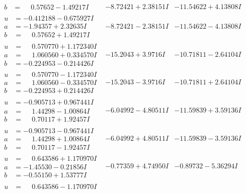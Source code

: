 \documentclass[1p]{elsarticle_modified}
\theoremstyle{definition}
\begin{document}
$$\begin{array}{c|c|c}
\begin{aligned}
b &= \phantom{-}0.57652 - 1.49217 I\end{aligned}
 & -8.72421 + 2.38151 I & -11.54622 + 4.13808 I \\ \hline\begin{aligned}
u &= -0.412188 - 0.675927 I \\
a &= -1.94357 + 2.32635 I \\
b &= \phantom{-}0.57652 + 1.49217 I\end{aligned}
 & -8.72421 - 2.38151 I & -11.54622 - 4.13808 I \\ \hline\begin{aligned}
u &= \phantom{-}0.570770 + 1.172340 I \\
a &= \phantom{-}1.060560 + 0.334570 I \\
b &= -0.224953 - 0.214426 I\end{aligned}
 & -15.2043 + 3.9716 I & -10.71811 - 2.64104 I \\ \hline\begin{aligned}
u &= \phantom{-}0.570770 - 1.172340 I \\
a &= \phantom{-}1.060560 - 0.334570 I \\
b &= -0.224953 + 0.214426 I\end{aligned}
 & -15.2043 - 3.9716 I & -10.71811 + 2.64104 I \\ \hline\begin{aligned}
u &= -0.905713 + 0.967441 I \\
a &= \phantom{-}1.44298 - 1.00864 I \\
b &= \phantom{-}0.70117 + 1.92457 I\end{aligned}
 & -6.04992 - 4.80511 I & -11.59839 + 3.59136 I \\ \hline\begin{aligned}
u &= -0.905713 - 0.967441 I \\
a &= \phantom{-}1.44298 + 1.00864 I \\
b &= \phantom{-}0.70117 - 1.92457 I\end{aligned}
 & -6.04992 + 4.80511 I & -11.59839 - 3.59136 I \\ \hline\begin{aligned}
u &= \phantom{-}0.643586 + 1.170970 I \\
a &= -1.45530 - 0.21856 I \\
b &= -0.55150 + 1.53777 I\end{aligned}
 & -0.77359 + 4.74950 I & -0.89732 - 5.36294 I \\ \hline\begin{aligned}
u &= \phantom{-}0.643586 - 1.170970 I \\

\end{aligned}
\end{array}$$
\end{document}
